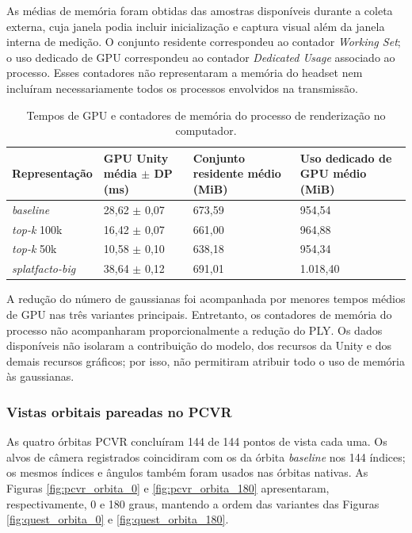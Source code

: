 As médias de memória foram obtidas das amostras disponíveis durante a coleta externa, cuja janela podia incluir inicialização e captura visual além da janela interna de medição. O conjunto residente correspondeu ao contador \textit{Working Set}; o uso dedicado de GPU correspondeu ao contador \textit{Dedicated Usage} associado ao processo. Esses contadores não representaram a memória do headset nem incluíram necessariamente todos os processos envolvidos na transmissão.

\begin{table}[H]
\centering
\footnotesize
\caption{Tempos de GPU e contadores de memória do processo de renderização no computador.}
\label{tab:recursos_pcvr}
\renewcommand{\arraystretch}{1.2}
\begin{tabularx}{\textwidth}{p{3.0cm}XXX}
\hline
\textbf{Representação} & \textbf{GPU Unity média $\pm$ DP (ms)} & \textbf{Conjunto residente médio (MiB)} & \textbf{Uso dedicado de GPU médio (MiB)} \\ \hline
\textit{baseline} & 28,62 $\pm$ 0,07 & 673,59 & 954,54 \\
\textit{top-k} 100k & 16,42 $\pm$ 0,07 & 661,00 & 964,88 \\
\textit{top-k} 50k & 10,58 $\pm$ 0,10 & 638,18 & 954,34 \\
\textit{splatfacto-big} & 38,64 $\pm$ 0,12 & 691,01 & 1.018,40 \\ \hline
\end{tabularx}
\end{table}

A redução do número de gaussianas foi acompanhada por menores tempos médios de GPU nas três variantes principais. Entretanto, os contadores de memória do processo não acompanharam proporcionalmente a redução do PLY. Os dados disponíveis não isolaram a contribuição do modelo, dos recursos da Unity e dos demais recursos gráficos; por isso, não permitiram atribuir todo o uso de memória às gaussianas.

\subsubsection{Vistas orbitais pareadas no PCVR}

As quatro órbitas PCVR concluíram 144 de 144 pontos de vista cada uma. Os alvos de câmera registrados coincidiram com os da órbita \textit{baseline} nos 144 índices; os mesmos índices e ângulos também foram usados nas órbitas nativas. As Figuras \ref{fig:pcvr_orbita_0} e \ref{fig:pcvr_orbita_180} apresentaram, respectivamente, 0 e 180 graus, mantendo a ordem das variantes das Figuras \ref{fig:quest_orbita_0} e \ref{fig:quest_orbita_180}.

